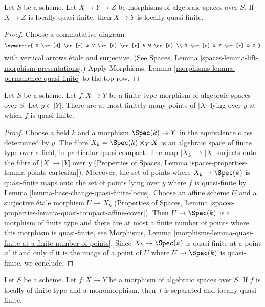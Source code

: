 \begin{lemma}
\label{lemma-permanence-quasi-finite}
Let $S$ be a scheme.
Let $X \to Y \to Z$ be morphisms of algebraic spaces over $S$.
If $X \to Z$ is locally quasi-finite, then $X \to Y$
is locally quasi-finite.
\end{lemma}

\begin{proof}
Choose a commutative diagram
$$
\xymatrix{
U \ar[d] \ar[r] & V \ar[d] \ar[r] & W \ar[d] \\
X \ar[r] & Y \ar[r] & Z
}
$$
with vertical arrows \'etale and surjective. (See
Spaces, Lemma \ref{spaces-lemma-lift-morphism-presentations}.)
Apply
Morphisms, Lemma \ref{morphisms-lemma-permanence-quasi-finite}
to the top row.
\end{proof}

\begin{lemma}
\label{lemma-quasi-finite-at-a-finite-number-of-points}
Let $S$ be a scheme. Let $f : X \to Y$ be a finite type
morphism of algebraic spaces over $S$. Let $y \in |Y|$.
There are at most finitely many
points of $|X|$ lying over $y$ at which $f$ is quasi-finite.
\end{lemma}

\begin{proof}
Choose a field $k$ and a morphism $\Spec(k) \to Y$ in the equivalence
class determined by $y$. The fibre $X_k = \Spec(k) \times_Y X$ is an
algebraic space of finite type over a field, in particular quasi-compact.
The map $|X_k| \to |X|$ surjects onto the fibre of $|X| \to |Y|$
over $y$ (Properties of Spaces, Lemma
\ref{spaces-properties-lemma-points-cartesian}).
Moreover, the set of points where $X_k \to \Spec(k)$ is
quasi-finite maps onto the set of points lying over $y$ where
$f$ is quasi-finite by Lemma \ref{lemma-base-change-quasi-finite-locus}.
Choose an affine scheme $U$ and a surjective \'etale morphism $U \to X_k$
(Properties of Spaces, Lemma
\ref{spaces-properties-lemma-quasi-compact-affine-cover}).
Then $U \to \Spec(k)$ is a morphism of finite type and there are at
most a finite number of points where this morphism is quasi-finite,
see Morphisms, Lemma
\ref{morphisms-lemma-quasi-finite-at-a-finite-number-of-points}.
Since $X_k \to \Spec(k)$ is quasi-finite at a point $x'$ if and only
if it is the image of a point of $U$ where $U \to \Spec(k)$ is
quasi-finite, we conclude.
\end{proof}

\begin{lemma}
\label{lemma-monomorphism-loc-finite-type-loc-quasi-finite}
Let $S$ be a scheme.
Let $f : X \to Y$ be a morphism of algebraic spaces over $S$.
If $f$ is locally of finite type and a monomorphism, then $f$
is separated and locally quasi-finite.
\end{lemma}

